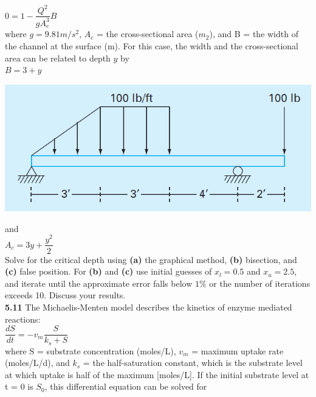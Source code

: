 \documentclass[../main.tex]{subfiles}
\begin{document}
\begin{multicols}{2}
    $0=1-\dfrac{Q^2}{gA^3_c}B$\\

    \noindent where $g = 9.81 m/s^2$, $A_c$ = the cross-sectional area ($m_2$),
    and B = the width of the channel at the surface (m). For this
    case, the width and the cross-sectional area can be related to
    depth $y$ by\\

    $B=3+y$\\

    \noindent
    \begin{minipage}{\linewidth}
        \centering
        \includegraphics[width=\linewidth]{./images/problem_5_9_1}
    \end{minipage}

    \noindent and\\

    $A_c = 3y+\dfrac{y^2}{2}$\\

    \noindent Solve for the critical depth using \textbf{(a)} the graphical method,
    \textbf{(b)} bisection, and \textbf{(c)} false position. For \textbf{(b)} and \textbf{(c)} use
    initial guesses of $x_l = 0.5$ and $x_u = 2.5$, and iterate until the
    approximate error falls below $1\%$ or the number of iterations
    exceeds 10. Discuss your results.\\

    \noindent\textbf{5.11} The Michaelis-Menten model describes the kinetics of
    enzyme mediated reactions:\\

    $\dfrac{dS}{dt} = -v_m\dfrac{S}{k_s+S}$\\

    \noindent where S = substrate concentration (moles/L), $v_m$ = maximum
    uptake rate (moles/L/d), and $k_s$ = the half-saturation
    constant, which is the substrate level at which uptake is half
    of the maximum [moles/L]. If the initial substrate level at
    t = 0 is $S_0$, this differential equation can be solved for\\


\end{multicols}
\end{document}
